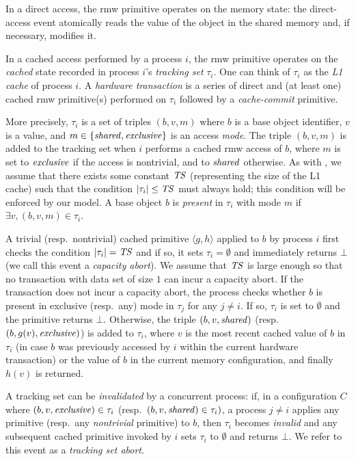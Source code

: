 In a direct access, the rmw primitive operates on the memory state:
the direct-access event atomically reads the value of the object in
the shared memory and, if necessary, modifies it.

In a cached access performed by a process $i$, the rmw primitive operates on the \emph{cached}
state recorded in process $i$'s \emph{tracking set} $\tau_i$. 
One can think of $\tau_i$ as the \emph{L1 cache} of process $i$.
A \emph{hardware transaction} is a series of direct and (at least one) cached rmw primitive(s) performed on $\tau_i$ followed by
a \emph{cache-commit} primitive. 
 
More precisely, $\tau_i$ is a set of triples $(b, v, m)$ where $b$ is a base object identifier, $v$ is a value, 
and $m \in \{\mathit{shared}, \mathit{exclusive}\}$ is an access \emph{mode}. 
The triple $(b, v, m)$ is added to the tracking set when $i$ performs a cached
rmw access of $b$, where $m$ is set to $\mathit{exclusive}$ if the access is
nontrivial, and to $\mathit{shared}$ otherwise.  
As with \cite{htmdisc15}, we assume that there exists some constant $\mathit{TS}$ (representing the size of the L1 cache)
such that the condition $|\tau_i| \leq \mathit{TS}$ must always hold; this
condition will be enforced by our model.
A base object $b$ is \emph{present} in $\tau_i$ with mode $m$ if $\exists v, (b,v,m) \in \tau_i$.

A trivial (resp.\ nontrivial) 
cached primitive $\langle g,h \rangle$ applied to $b$ 
by process $i$ first checks the condition $|\tau_i|=\mathit{TS}$ and if so, it
sets $\tau_i=\emptyset$ and immediately returns $\bot$ (we call this event a
\emph{capacity abort}). 
We assume that $\mathit{TS}$ is large enough so that no transaction 
with data set of size $1$ can incur a capacity abort.
%
If the transaction does not incur a capacity abort, the process checks whether $b$ is present in exclusive
(resp.\ any) mode in $\tau_j$ 
for any $j\neq i$. If so, $\tau_i$ is set to $\emptyset$ and the
primitive returns $\bot$. 
%
Otherwise, the triple $(b, v, \mathit{shared})$ (resp. $(b, g(v), \mathit{exclusive})$)
is added to $\tau_i$,  where $v$ is the most recent cached value of $b$ in $\tau_i$
(in case $b$ was previously accessed by $i$ within the current
hardware transaction) or the value of $b$ in the current
memory configuration, and finally $h(v)$ is returned.
%

A tracking set can be \emph{invalidated} by a concurrent process: 
if, in a configuration $C$ where  $(b,v,\mathit{exclusive})\in\tau_i$
(resp.\ $(b,v,\mathit{shared})\in\tau_i)$,  a process $j\neq i$ applies any primitive 
(resp.\ any \emph{nontrivial} primitive) to $b$, then $\tau_i$ becomes
\emph{invalid} and any subsequent cached primitive invoked by $i$
sets $\tau_i$ to $\emptyset$ and returns $\bot$. We refer to this event as a \emph{tracking set abort}.

